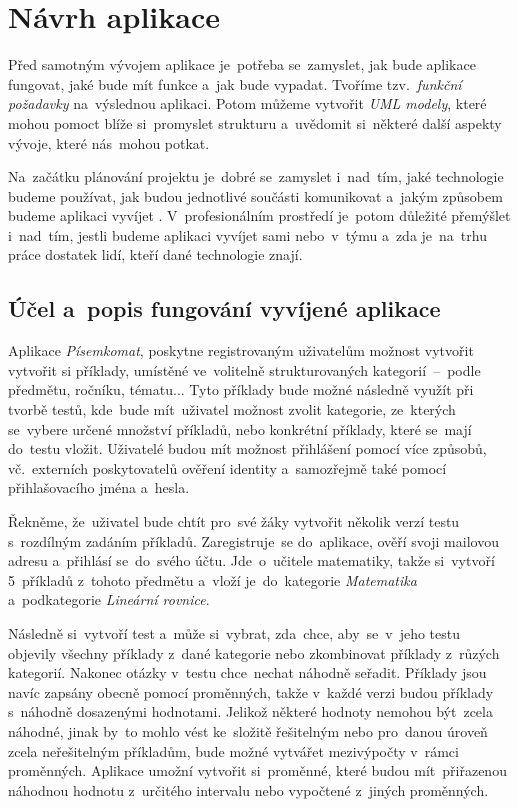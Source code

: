 \documentclass[10pt,a4paper]{article}
\begin{document}
	\section{Návrh aplikace}
        Před samotným vývojem aplikace je~potřeba se~zamyslet, jak bude aplikace fungovat, jaké bude mít funkce a~jak bude vypadat. Tvoříme tzv.~\emph{funkční požadavky} na~výslednou aplikaci. Potom můžeme vytvořit \emph{UML modely}, které mohou pomoct blíže si~promyslet strukturu a~uvědomit si~některé další aspekty vývoje, které nás~mohou potkat.

        Na~začátku plánování projektu je~dobré se~zamyslet i~nad~tím, jaké technologie budeme používat, jak budou jednotlivé součásti komunikovat a~jakým způsobem budeme aplikaci vyvíjet \cite{bctynovsky:specifikacepozadavku}. V~profesionálním prostředí je~potom důležité přemýšlet i~nad~tím, jestli budeme aplikaci vyvíjet sami nebo~v~týmu a~zda je~na~trhu práce dostatek lidí, kteří dané technologie znají.

        \subsection{Účel a~popis fungování vyvíjené aplikace}
        Aplikace \emph{Písemkomat}, poskytne registrovaným uživatelům možnost vytvořit vytvořit si příklady, umístěné ve~volitelně strukturovaných kategorií~--~podle předmětu, ročníku, tématu... Tyto příklady bude možné následně využít při tvorbě testů, kde~bude mít~uživatel možnost zvolit kategorie, ze~kterých se~vybere určené množství příkladů, nebo konkrétní příklady, které se~mají do~testu vložit. Uživatelé budou mít možnost přihlášení pomocí více způsobů, vč.~externích poskytovatelů ověření identity a~samozřejmě také pomocí přihlašovacího jména a~hesla.
        
        Řekněme, že~uživatel bude chtít pro~své žáky vytvořit několik verzí testu s~rozdílným zadáním příkladů. Zaregistruje~se do~aplikace, ověří svoji mailovou adresu a~přihlásí se~do~svého účtu. Jde~o~učitele matematiky, takže si~vytvoří 5~příkladů z~tohoto předmětu a~vloží je~do~kategorie \emph{Matematika} a~podkategorie \emph{Lineární rovnice}.

        Následně si~vytvoří test a~může si~vybrat, zda~chce, aby~se~v~jeho testu objevily všechny příklady z~dané kategorie nebo zkombinovat příklady z~růzých kategorií. Nakonec otázky v~testu chce~nechat náhodně seřadit. Příklady jsou navíc zapsány obecně pomocí proměnných, takže v~každé verzi budou příklady s~náhodně dosazenými hodnotami. Jelikož některé hodnoty nemohou být~zcela náhodné, jinak by~to mohlo vést ke~složitě řešitelným nebo pro~danou úroveň zcela neřešitelným příkladům, bude možné vytvářet mezivýpočty v~rámci proměnných. Aplikace umožní vytvořit si~proměnné, které budou mít~přiřazenou náhodnou hodnotu z~určitého intervalu nebo vypočtené z~jiných proměnných.
\end{document}
